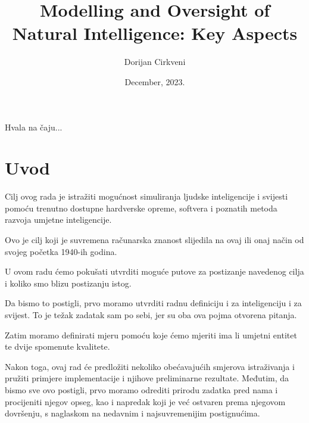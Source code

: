 \documentclass[diplomskirad]{fer}
\title{Modelling and Oversight of Natural Intelligence: Key Aspects}
\author{Dorijan Cirkveni}
\date{December, 2023.}
\begin{document}
\maketitle






\begin{zahvale}
  Hvala na čaju...
\end{zahvale}


\mainmatter


\tableofcontents


\chapter{Uvod}
\label{chp:introduction}
	Cilj ovog rada je istražiti mogućnost simuliranja ljudske inteligencije i svijesti pomoću trenutno dostupne hardverske opreme, softvera i poznatih metoda razvoja umjetne inteligencije.
	
	Ovo je cilj koji je suvremena računarska znanost slijedila na ovaj ili onaj način od svojeg početka 1940-ih godina.
	
	U ovom radu ćemo pokušati utvrditi moguće putove za postizanje navedenog cilja i koliko smo blizu postizanju istog.
	
	Da bismo to postigli, prvo moramo utvrditi radnu definiciju i za inteligenciju i za svijest. To je težak zadatak sam po sebi, jer su oba ova pojma otvorena pitanja.
	
	Zatim moramo definirati mjeru pomoću koje ćemo mjeriti ima li umjetni entitet
	te dvije spomenute kvalitete.
	
	Nakon toga, ovaj rad će predložiti nekoliko obećavajućih smjerova
	istraživanja i pružiti primjere implementacije
	i njihove preliminarne rezultate.
Međutim, da bismo sve ovo postigli, prvo moramo odrediti prirodu zadatka pred nama i procijeniti njegov opseg, kao i napredak koji je već ostvaren prema njegovom dovršenju, s naglaskom na nedavnim i najsuvremenijim postignućima.
\end{document}
